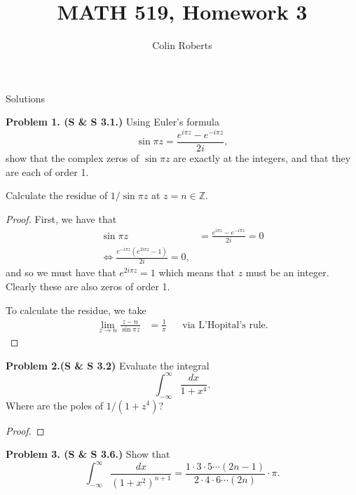 \documentclass[leqno]{article}
\author{Colin Roberts}
\title{MATH 519, Homework 3}
\theoremstyle{nonumberplain}
\newtheorem{proof}{Proof}
\newcommand{\Z}{\mathbb{Z}}
\begin{document}
\maketitle
\begin{large}
\begin{center}
Solutions
\end{center}
\end{large}


\noindent\textbf{Problem 1. (S \& S 3.1.)} Using Euler's formula
\[
\sin \pi z = \frac{e^{i\pi z}-e^{-i\pi z}}{2i},
\]
show that the complex zeros of $\sin \pi z$ are exactly at the integers, and that they are each of order 1. 

Calculate the residue of $1/\sin \pi z$ at $z=n\in \Z$.

\begin{proof}
First, we have that 
\begin{align*}
\sin \pi z &= \frac{e^{i\pi z}-e^{-i \pi z}}{2i}=0\\
\iff \frac{e^{-i\pi z}(e^{2i\pi z}-1)}{2i}=0,
\end{align*}
and so we must have that $e^{2i\pi z}=1$ which means that $z$ must be an integer. Clearly these are also zeros of order 1.

To calculate the residue, we take 
\begin{align*}
\lim_{z\to n} \frac{z-n}{\sin \pi z} & = \frac{1}{\pi} && \textrm{via L'Hopital's rule.}
\end{align*}
\end{proof}

\vspace*{1cm}


\noindent\textbf{Problem 2.(S \& S 3.2)} Evaluate the integral
\[
\int_{-\infty}^\infty \frac{dx}{1+x^4}.
\]
Where are the poles of $1/(1+z^4)$?

\begin{proof}
\end{proof}

\vspace*{1cm}

\noindent\textbf{Problem 3. (S \& S 3.6.)} Show that
\[
\int_{-\infty}^\infty \frac{dx}{(1+x^2)^{n+1}} = \frac{1\cdot 3 \cdot 5 \cdots (2n-1)}{2\cdot 4\cdot 6 \cdots (2n)}\cdot \pi.
\]
\end{document}
